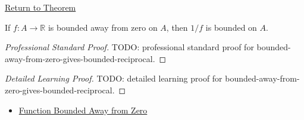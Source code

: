 \newpage
{}
\label{prf:bounded-away-from-zero-gives-bounded-reciprocal}

\begin{remark*}[Return]
\hyperref[thm:bounded-away-from-zero-gives-bounded-reciprocal]{Return to Theorem}
\end{remark*}

\begin{theorem*}
If \(f:A\to\mathbb{R}\) is bounded away from zero on \(A\), then \(1/f\) is
bounded on \(A\).
\end{theorem*}

\begin{proof}[Professional Standard Proof]
\LRAProofBodyStart
TODO: professional standard proof for bounded-away-from-zero-gives-bounded-reciprocal.
\end{proof}

\begin{proof}[Detailed Learning Proof]
\LRAProofBodyStart
TODO: detailed learning proof for bounded-away-from-zero-gives-bounded-reciprocal.
\end{proof}

\begin{remark*}
\end{remark*}

\begin{dependencies}
\begin{itemize}
  \item \hyperref[def:function-bounded-away-from-zero]{Function Bounded Away from Zero}
\end{itemize}
\end{dependencies}

\clearpage
